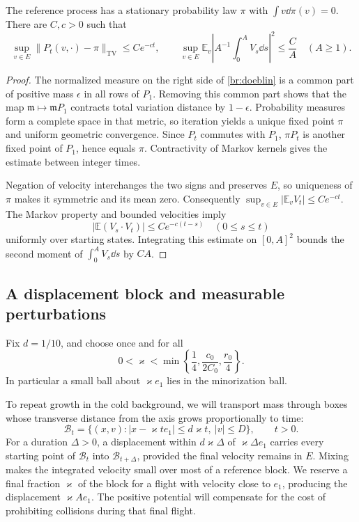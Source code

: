 \begin{lemma}\label{br:mixing}
The reference process has a stationary probability law \(\pi\) with
\(\int v\dd\pi(v)=0\). There are \(C,c>0\) such that
\[
\sup_{v\in E}\|P_t(v,\cdot)-\pi\|_{\mathrm{TV}}\le Ce^{-ct},
\qquad
\sup_{v\in E}\mathbb E_v\left|
A^{-1}\int_0^A V_s\dd s\right|^2\le\frac C A\quad(A\ge1).
\]
\end{lemma}

\begin{proof}
The normalized measure on the right side of \eqref{br:doeblin} is a
common part of positive mass \(\epsilon\) in all rows of \(P_1\).
Removing this common part shows that the map \(\mathfrak m\mapsto\mathfrak m P_1\)
contracts total variation distance by \(1-\epsilon\). Probability
measures form a complete space in that metric, so iteration yields a
unique fixed point \(\pi\) and uniform geometric convergence.
Since \(P_t\) commutes with \(P_1\), \(\pi P_t\) is another fixed point
of \(P_1\), hence equals \(\pi\). Contractivity of Markov kernels gives
the estimate between integer times.

Negation of velocity interchanges the two signs and preserves \(E\),
so uniqueness of \(\pi\) makes it symmetric and its mean zero.
Consequently \(\sup_{v\in E}|\mathbb E_vV_t|\le Ce^{-ct}\).
The Markov property and bounded velocities imply
\[
|\mathbb E(V_s\cdot V_t)|\le Ce^{-c(t-s)}\quad(0\le s\le t)
\]
uniformly over starting states. Integrating this estimate on
\([0,A]^2\) bounds the second moment of \(\int_0^A V_s\dd s\) by \(CA\).
\end{proof}

\subsection{A displacement block and measurable perturbations}

Fix \(d=1/10\), and choose once and for all
\begin{equation}\label{br:kappa-choice}
0<\varkappa<\min\left\{\frac14,\frac{c_0}{2C_0},\frac{r_0}{4}\right\}.
\end{equation}
In particular a small ball about \(\varkappa e_1\) lies in the
minorization ball.

To repeat growth in the cold background, we will transport mass through
boxes whose transverse distance from the axis grows proportionally to time:
\[
\mathcal B_t=\{(x,v):|x-\varkappa te_1|\le d\varkappa t,\ |v|\le D\},
\qquad t>0.
\]
For a duration \(\Delta>0\), a displacement within
\(d\varkappa\Delta\) of \(\varkappa\Delta e_1\)
carries every starting point of \(\mathcal B_t\) into
\(\mathcal B_{t+\Delta}\), provided the final velocity remains in
\(E\). Mixing makes the integrated velocity small over most of a
reference block. We reserve a final fraction \(\varkappa\) of the block
for a flight with velocity close to \(e_1\), producing the displacement
\(\varkappa A e_1\). The positive potential will compensate for the cost
of prohibiting collisions during that final flight.

